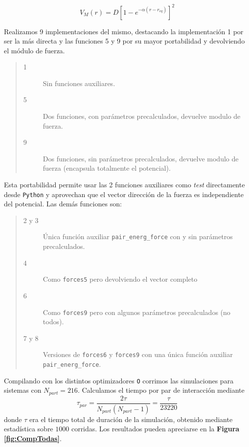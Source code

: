 \documentclass[twoside, 12pt]{article}
\begin{document}
\[ V_{M} (r) = D\left[1-e^{-\alpha (r-r_{eq})}\right]^2\]

Realizamos 9 implementaciones del mismo, destacando la implementaci\'on 1 por ser la m\'as directa y las funciones 5 y 9 por su mayor portabilidad y devolviendo el módulo de fuerza.

\begin{quote}
\begin{description}
\item[1] Sin funciones auxiliares.
\item[5] Dos funciones, con parámetros precalculados, devuelve modulo de fuerza.
\item[9] Dos funciones, sin parámetros precalculados, devuelve modulo de fuerza (encapsula totalmente el potencial).
\end{description}
\end{quote}

Esta portabilidad permite usar las 2 funciones auxiliares como \textit{test} directamente desde \texttt{Python} y aprovechan que el vector dirección de la fuerza es independiente del potencial. Las demás funciones son:

\begin{quote}
\begin{description}
\item[2 y 3] Única función auxiliar \texttt{pair\_energ\_force} con y sin parámetros precalculados.
\item[4] Como \texttt{forces5} pero devolviendo el vector completo
\item[6] Como \texttt{forces9} pero con algunos parámetros precalculados (no todos).
\item[7 y 8] Versiones de \texttt{forces6} y \texttt{forces9} con una única función auxiliar \texttt{pair\_energ\_force}.
\end{description}
\end{quote}

Compilando con los distintos optimizadores \texttt{O} corrimos las simulaciones para sistemas con $N_{part}=216$. Calculamos el tiempo por par de interacci\'on mediante 
\[ \tau_{par}=\frac{2\tau}{N_{part}(N_{part}-1)} =\frac{\tau}{23220} \]
donde $\tau$ era el tiempo total de duraci\'on de la simulaci\'on, obtenido mediante estad\'istica sobre $1000$ corridas. Los resultados pueden apreciarse en la \textbf{Figura \ref{fig:CompTodas}}.
\end{document}
